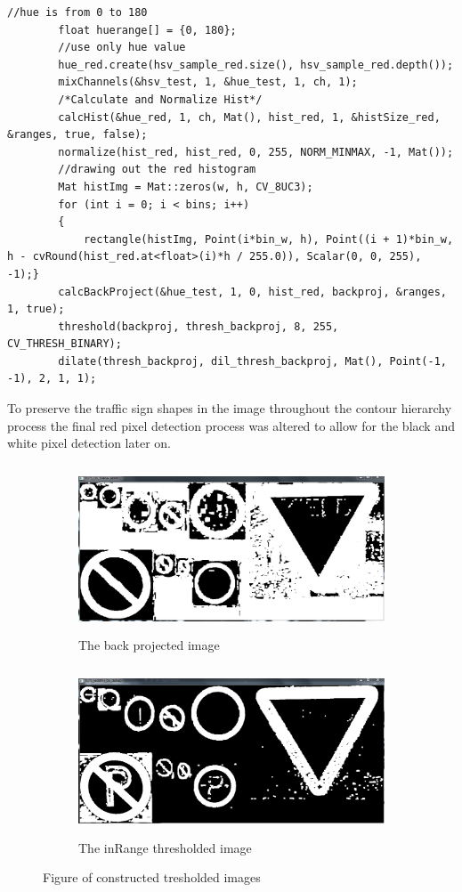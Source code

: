 \documentclass{article}
\begin{document}
\begin{lstlisting}
//hue is from 0 to 180
		float huerange[] = {0, 180};
		//use only hue value
		hue_red.create(hsv_sample_red.size(), hsv_sample_red.depth());
		mixChannels(&hsv_test, 1, &hue_test, 1, ch, 1);
		/*Calculate and Normalize Hist*/
		calcHist(&hue_red, 1, ch, Mat(), hist_red, 1, &histSize_red, &ranges, true, false);
		normalize(hist_red, hist_red, 0, 255, NORM_MINMAX, -1, Mat());
		//drawing out the red histogram
		Mat histImg = Mat::zeros(w, h, CV_8UC3);
		for (int i = 0; i < bins; i++)
		{
			rectangle(histImg, Point(i*bin_w, h), Point((i + 1)*bin_w, h - cvRound(hist_red.at<float>(i)*h / 255.0)), Scalar(0, 0, 255), -1);}
		calcBackProject(&hue_test, 1, 0, hist_red, backproj, &ranges, 1, true);	
		threshold(backproj, thresh_backproj, 8, 255, CV_THRESH_BINARY);
		dilate(thresh_backproj, dil_thresh_backproj, Mat(), Point(-1, -1), 2, 1, 1);
\end{lstlisting}


To preserve the traffic sign shapes in the image throughout the contour hierarchy process the final red pixel detection process was altered to allow for the black and white pixel detection later on.\\
\begin{figure}[H]
\begin{subfigure}{0.5\textwidth}
\includegraphics[width=0.9\linewidth, height=5cm]{N_DIL_THRESH_BKPROJ.PNG} 
\caption{The back projected image}
\label{fig:subim1}
\end{subfigure}
\begin{subfigure}{0.5\textwidth}

\includegraphics[width=0.9\linewidth, height=5cm]{N_MORPH_DIL_INRNG.PNG}
\caption{The inRange thresholded image}
\label{fig:subim2}
\end{subfigure}
\caption{Figure of constructed tresholded images}
\label{fig:image2}
\end{figure}
\end{document}
